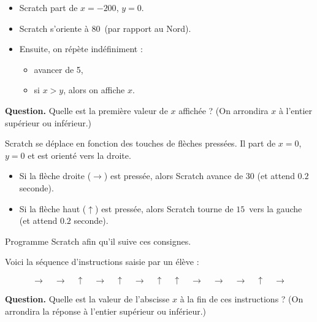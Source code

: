 \documentclass[class=report,crop=false, 12pt]{standalone}
\begin{document}


\begin{enigme}
\sauteligne

\begin{itemize}
  \item Scratch part de $x=-200$, $y=0$.
  \item Scratch s'oriente à $80$\textdegree\ (par rapport au Nord).
  \item Ensuite, on répète indéfiniment :
    \begin{itemize}
      \item avancer de 5,
      \item si $x > y$, alors on affiche $x$.
    \end{itemize}
\end{itemize}

\bigskip

\textbf{Question.} Quelle est la première valeur de $x$ affichée ?
(On arrondira $x$ à l'entier supérieur ou inférieur.)



\end{enigme}


\begin{enigme}


Scratch se déplace en fonction des touches de flèches pressées.
Il part de $x=0$, $y=0$ et est orienté vers la droite.

\begin{itemize}
  \item Si la flèche droite ($\rightarrow$) est pressée, alors Scratch avance de $30$
  (et attend $0.2$ seconde).
  \item Si la flèche haut ($\uparrow$) est pressée, alors Scratch tourne de $15$\textdegree\  vers la gauche (et attend $0.2$ seconde).  
\end{itemize}

Programme Scratch afin qu'il suive ces consignes.

\bigskip

Voici la séquence d'instructions saisie par un élève :

{\Large
$$\rightarrow \quad \rightarrow \quad \uparrow \quad \rightarrow \quad \uparrow \quad \rightarrow \quad \uparrow \quad \uparrow \quad \rightarrow \quad 
\rightarrow \quad \rightarrow \quad \uparrow \quad \rightarrow $$
}

\bigskip

\textbf{Question.} Quelle est la valeur de l'abscisse $x$ à la fin de ces instructions ?
(On arrondira la réponse à l'entier supérieur ou inférieur.)


\end{enigme}
\end{document}
